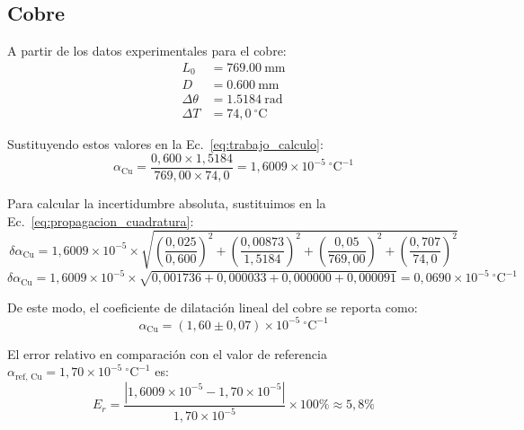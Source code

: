 \subsection{Cobre}

A partir de los datos experimentales para el cobre:
\begin{align*}
    L_0 &= \qty{769,00}{\milli\meter} \\
    D &= \qty{0,600}{\milli\meter} \\
    \Delta\theta &= \qty{1,5184}{\radian} \\
    \Delta T &= 74{,}0\ ^\circ\text{C}
\end{align*}

Sustituyendo estos valores en la Ec.~\eqref{eq:trabajo_calculo}:
\begin{equation*}
    \alpha_{\text{Cu}} = \frac{0{,}600 \times 1{,}5184}{769{,}00 \times 74{,}0} = 1{,}6009 \times 10^{-5}\ ^\circ\text{C}^{-1}
\end{equation*}

Para calcular la incertidumbre absoluta, sustituimos en la Ec.~\eqref{eq:propagacion_cuadratura}:
\begin{equation*}
    \delta\alpha_{\text{Cu}} = 1{,}6009 \times 10^{-5} \times \sqrt{
        \left(\frac{0{,}025}{0{,}600}\right)^2 +
        \left(\frac{0{,}00873}{1{,}5184}\right)^2 +
        \left(\frac{0{,}05}{769{,}00}\right)^2 +
        \left(\frac{0{,}707}{74{,}0}\right)^2
    }
\end{equation*}
\begin{equation*}
    \delta\alpha_{\text{Cu}} = 1{,}6009 \times 10^{-5} \times \sqrt{
        0{,}001736 + 0{,}000033 + 0{,}000000 + 0{,}000091
    } = 0{,}0690 \times 10^{-5}\ ^\circ\text{C}^{-1}
\end{equation*}

De este modo, el coeficiente de dilatación lineal del cobre se reporta como:
\begin{equation}
    \alpha_{\text{Cu}} = (1{,}60 \pm 0{,}07) \times 10^{-5}\ ^\circ\text{C}^{-1}
    \label{eq:res_cu}
\end{equation}

El error relativo en comparación con el valor de referencia $\alpha_{\text{ref, Cu}} = 1{,}70 \times 10^{-5}\ ^\circ\text{C}^{-1}$ es:
\begin{equation*}
    E_r = \frac{|1{,}6009 \times 10^{-5} - 1{,}70 \times 10^{-5}|}{1{,}70 \times 10^{-5}} \times 100\% \approx 5{,}8\%
\end{equation*}


